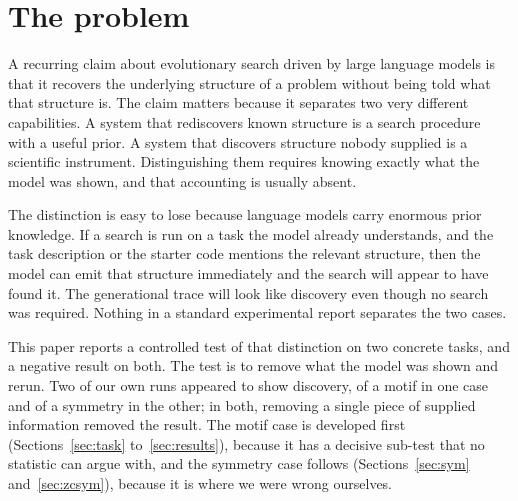\documentclass[11pt]{article}
\begin{document}
\begin{abstract}
features are exactly the pairs of eight qubits, built an exactly equivariant
circuit at generation 33, and raised test accuracy from 86.7\% to 96.0\% while
cutting parameters from 146 to 26. A third experiment shows how narrow that
capability is. We deleted the one sentence stating that the features are qubit
pairs and changed nothing else, including the reward. Across three proposer
models running 80 generations each, no arm ever built an equivariant circuit and
test accuracy stalled six points lower, at 89 to 90\%. The stated premise was
doing the work, not the search. Rerunning the hidden-answer motif task at the
same 80 generations changed nothing either: usage stayed at or below chance, and
the gates that were placed concentrated on the diagonals of an unpermuted board,
which the relabelling had made wrong. These systems perform one deduction from
what they are shown, and measurement corrects them when it is wrong. They do not
recover the premise itself from the score.
\end{abstract}

\section{The problem}

A recurring claim about evolutionary search driven by large language models is
that it recovers the underlying structure of a problem without being told what
that structure is. The claim matters because it separates two very different
capabilities. A system that rediscovers known structure is a search procedure
with a useful prior. A system that discovers structure nobody supplied is a
scientific instrument. Distinguishing them requires knowing exactly what the
model was shown, and that accounting is usually absent.

The distinction is easy to lose because language models carry enormous prior
knowledge. If a search is run on a task the model already understands, and the
task description or the starter code mentions the relevant structure, then the
model can emit that structure immediately and the search will appear to have
found it. The generational trace will look like discovery even though no search
was required. Nothing in a standard experimental report separates the two cases.

This paper reports a controlled test of that distinction on two concrete tasks,
and a negative result on both. The test is to remove what the model was shown and
rerun. Two of our own runs appeared to show discovery, of a motif in one case and
of a symmetry in the other; in both, removing a single piece of supplied
information removed the result. The motif case is developed first
(Sections~\ref{sec:task} to~\ref{sec:results}), because it has a decisive
sub-test that no statistic can argue with, and the symmetry case follows
(Sections~\ref{sec:sym} and~\ref{sec:zcsym}), because it is where we were wrong
ourselves.
\end{document}
